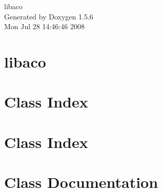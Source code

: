 \documentclass[a4paper]{book}
\begin{document}
\begin{titlepage}
\vspace*{7cm}
\begin{center}
{\Large libaco }\\
\vspace*{1cm}
{\large Generated by Doxygen 1.5.6}\\
\vspace*{0.5cm}
{\small Mon Jul 28 14:46:46 2008}\\
\end{center}
\end{titlepage}
\clearemptydoublepage
{}
\tableofcontents
\clearemptydoublepage
{}
\chapter{libaco}
\label{index}\hypertarget{index}{}
\chapter{Class Index}

\chapter{Class Index}

\chapter{Class Documentation}












\printindex
\end{document}

